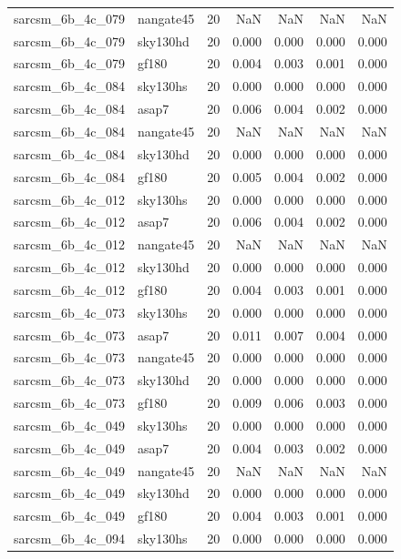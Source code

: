 \begin{tabular}{llrrrrr}
sarcsm\_6b\_4c\_079 & nangate45 & 20 & NaN & NaN & NaN & NaN \\
sarcsm\_6b\_4c\_079 & sky130hd & 20 & 0.000 & 0.000 & 0.000 & 0.000 \\
sarcsm\_6b\_4c\_079 & gf180 & 20 & 0.004 & 0.003 & 0.001 & 0.000 \\
sarcsm\_6b\_4c\_084 & sky130hs & 20 & 0.000 & 0.000 & 0.000 & 0.000 \\
sarcsm\_6b\_4c\_084 & asap7 & 20 & 0.006 & 0.004 & 0.002 & 0.000 \\
sarcsm\_6b\_4c\_084 & nangate45 & 20 & NaN & NaN & NaN & NaN \\
sarcsm\_6b\_4c\_084 & sky130hd & 20 & 0.000 & 0.000 & 0.000 & 0.000 \\
sarcsm\_6b\_4c\_084 & gf180 & 20 & 0.005 & 0.004 & 0.002 & 0.000 \\
sarcsm\_6b\_4c\_012 & sky130hs & 20 & 0.000 & 0.000 & 0.000 & 0.000 \\
sarcsm\_6b\_4c\_012 & asap7 & 20 & 0.006 & 0.004 & 0.002 & 0.000 \\
sarcsm\_6b\_4c\_012 & nangate45 & 20 & NaN & NaN & NaN & NaN \\
sarcsm\_6b\_4c\_012 & sky130hd & 20 & 0.000 & 0.000 & 0.000 & 0.000 \\
sarcsm\_6b\_4c\_012 & gf180 & 20 & 0.004 & 0.003 & 0.001 & 0.000 \\
sarcsm\_6b\_4c\_073 & sky130hs & 20 & 0.000 & 0.000 & 0.000 & 0.000 \\
sarcsm\_6b\_4c\_073 & asap7 & 20 & 0.011 & 0.007 & 0.004 & 0.000 \\
sarcsm\_6b\_4c\_073 & nangate45 & 20 & 0.000 & 0.000 & 0.000 & 0.000 \\
sarcsm\_6b\_4c\_073 & sky130hd & 20 & 0.000 & 0.000 & 0.000 & 0.000 \\
sarcsm\_6b\_4c\_073 & gf180 & 20 & 0.009 & 0.006 & 0.003 & 0.000 \\
sarcsm\_6b\_4c\_049 & sky130hs & 20 & 0.000 & 0.000 & 0.000 & 0.000 \\
sarcsm\_6b\_4c\_049 & asap7 & 20 & 0.004 & 0.003 & 0.002 & 0.000 \\
sarcsm\_6b\_4c\_049 & nangate45 & 20 & NaN & NaN & NaN & NaN \\
sarcsm\_6b\_4c\_049 & sky130hd & 20 & 0.000 & 0.000 & 0.000 & 0.000 \\
sarcsm\_6b\_4c\_049 & gf180 & 20 & 0.004 & 0.003 & 0.001 & 0.000 \\
sarcsm\_6b\_4c\_094 & sky130hs & 20 & 0.000 & 0.000 & 0.000 & 0.000 \\

\end{tabular}
